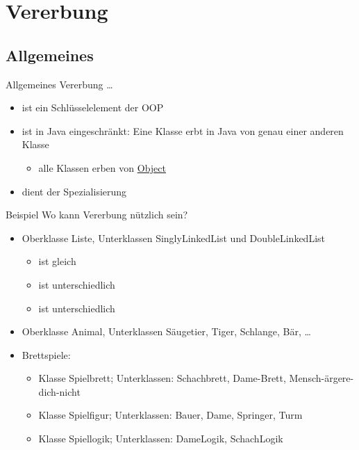 \documentclass[usepdftitle=false,hyperref={pdfpagelabels=false}]{beamer}
\begin{document}
\section{Vererbung}
\subsection{Allgemeines}
\begin{frame}{Allgemeines}
    Vererbung \dots
    \begin{itemize}[<+->]
        \item ist ein Schlüsselelement der OOP
        \item ist in Java eingeschränkt: Eine Klasse erbt in Java
              von genau einer anderen Klasse
            \begin{itemize}
              \item alle Klassen erben von \href{http://docs.oracle.com/javase/7/docs/api/java/lang/Object.html}{Object}
            \end{itemize}
        \item dient der Spezialisierung
    \end{itemize}
\end{frame}

\begin{frame}{Beispiel}
    Wo kann Vererbung nützlich sein?
    \begin{itemize}[<+->]
        \item Oberklasse Liste, Unterklassen SinglyLinkedList und 
              DoubleLinkedList
          \begin{itemize}
            \item {} ist gleich
            \item {} ist unterschiedlich
            \item {} ist unterschiedlich
          \end{itemize}
        \item Oberklasse Animal, Unterklassen Säugetier, Tiger, Schlange, Bär, \dots
        \item Brettspiele: 
            \begin{itemize}
                \item Klasse Spielbrett; Unterklassen: Schachbrett, Dame-Brett, Mensch-ärgere-dich-nicht
                \item Klasse Spielfigur; Unterklassen: Bauer, Dame, Springer, Turm
                \item Klasse Spiellogik; Unterklassen: DameLogik, SchachLogik
            \end{itemize}
    \end{itemize}
\end{frame}
\end{document}
